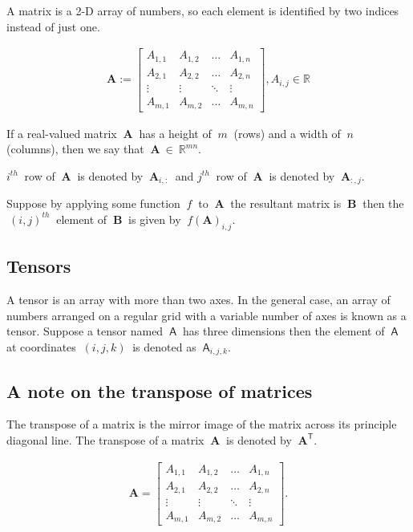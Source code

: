 \documentclass[12pt]{article}
\begin{document}
A matrix is a 2-D array of numbers, so each element is identified by two indices instead of just one.

\begin{align}
\mathbf{A} := \begin{bmatrix} {A}_{1,1} & {A}_{1,2} & \ldots & {A}_{1,n}\\ {A}_{2,1} & {A}_{2,2} & \ldots & {A}_{2,n} \\ \vdots & \vdots & \ddots & \vdots \\ {A}_{m,1} & {A}_{m,2} & \ldots & {A}_{m,n}\end{bmatrix}, A_{i,j} \in \mathbb{R}
\end{align}

If a real-valued matrix $\ \mathbf{A}\ $ has a height of $\ m\ $ (rows) and a width of $\ n\ $ (columns), then we say that $\ \mathbf{A}\ \in \ \mathbb{R}^{mn}.$

$i^{th}\ $ row of $\ \mathbf{A}\ $ is denoted by $\ \mathbf{A}_{i,:}\ $ and $j^{th}\ $ row of $\ \mathbf{A}\ $ is denoted by $\ \mathbf{A}_{:,j}.\ $

Suppose by applying some function $\ f\ $ to $\ \mathbf{A}\ $ the resultant matrix is $\ \mathbf{B}\ $ then the $\ (i,j)^{th}\ $ element of $\ \mathbf{B}\ $ is given by $\ f(\mathbf{A})_{i,j}.\ $

\subsection{Tensors}

A tensor is an array with more than two axes. In the general case, an array of numbers arranged on a regular grid with a variable number of axes is known as a tensor. Suppose a tensor named $\ \mathsf{A}\ $ has three dimensions then the element of $\ \mathsf{A}\ $ at coordinates $\ (i, j, k)\ $ is denoted as $\ \mathsf{A}_{i,j,k}.$

\subsection{A note on the transpose of matrices}

The transpose of a matrix is the mirror image of the matrix across its principle diagonal line. The transpose of a matrix $\ \mathbf{A}\ $ is denoted by $\ \mathbf{A}^{\mathsf{T}}.$

\begin{align}
\mathbf{A} = \begin{bmatrix} {A}_{1,1} & {A}_{1,2} & \ldots & {A}_{1,n}\\ {A}_{2,1} & {A}_{2,2} & \ldots & {A}_{2,n} \\ \vdots & \vdots & \ddots & \vdots \\ {A}_{m,1} & {A}_{m,2} & \ldots & {A}_{m,n}\end{bmatrix}.
\end{align}
\end{document}
